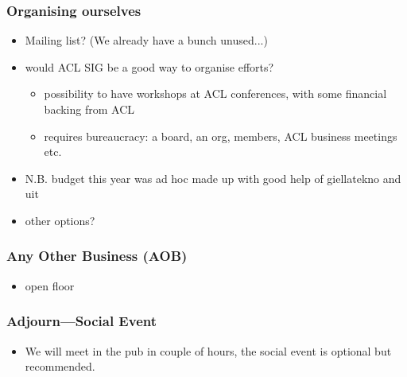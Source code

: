 \documentclass{beamer}
\begin{document}
\begin{frame}
    \frametitle{Organising ourselves}
    \begin{itemize}
        \item Mailing list? (We already have a bunch unused...)
        \item would ACL SIG be a good way to organise efforts?
            \begin{itemize}
                \item possibility to have workshops at ACL conferences,
                    with some financial backing from ACL
                \item requires bureaucracy: a board, an org, members,
                    ACL business meetings etc.
            \end{itemize}
        \item N.B. budget this year was ad hoc made up with good help
            of giellatekno and uit
        \item other options?
    \end{itemize}
\end{frame}

\begin{frame}
    \frametitle{Any Other Business (AOB)}
    \begin{itemize}
        \item open floor
    \end{itemize}
\end{frame}

\begin{frame}
    \frametitle{Adjourn---Social Event}
    \begin{itemize}
        \item We will meet in the pub in couple of hours, the social
            event is optional but recommended.
    \end{itemize}
\end{frame}
\end{document}
